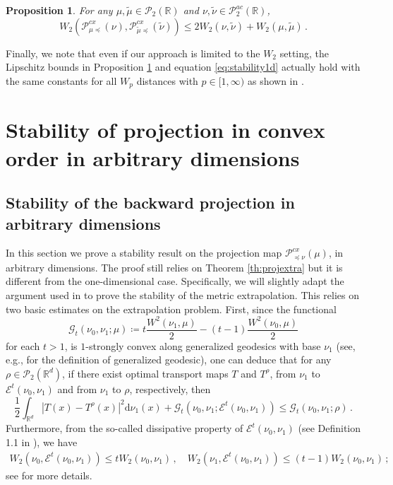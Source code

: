 \documentclass[12pt]{amsart}
\def\ed{\mathrm{d}}
\def\mc#1{\mathcal{#1}}
\newtheorem{proposition}{Proposition}
\begin{document}
\begin{proposition}\label{prop:lipforward1d}
    For any $\mu, \tilde{\mu}\in\mc{P}_2(\mathbb{R})$ and $\nu,\tilde{\nu}\in\mc{P}^{ac}_2(\mathbb{R})$,
\[
    W_2(\mathscr{P}_{\mu \preceq }^{cx}(\nu),\mathscr{P}_{\tilde{\mu} \preceq }^{cx}(\tilde{\nu}))\leq 2 W_2(\nu,\tilde{\nu}) +  W_2( \mu, \tilde{\mu})\,.
\]
\end{proposition}



Finally, we note that even if our approach is limited to the $W_2$ setting, the Lipschitz bounds in Proposition \ref{prop:lipforward1d} and equation \eqref{eq:stability1d} actually hold with the same constants for all $W_p$ distances with $p \in [1,\infty)$ as shown in \cite[Theorem 1.1]{jourdain2023lipschitz}.


\section{Stability of projection in convex order in arbitrary dimensions}

\subsection{Stability of the backward projection in arbitrary dimensions}

In this section we prove a stability result on the projection map $\mathscr{P}^{cx}_{\preceq \nu}(\mu)$,
in arbitrary  dimensions. The proof still relies on Theorem \ref{th:projextra} but it is different from the one-dimensional case.
Specifically, we will slightly adapt the argument used in \cite{Gallouet2025} to prove the stability of the metric extrapolation. This relies on two basic estimates on the extrapolation problem. 
First, since the functional
\[
\mc{G}_t(\nu_0,\nu_1; \mu) \coloneqq t \frac{W^2(\nu_1,\mu)}{2} - (t-1) \frac{W^2(\nu_0,\mu)}{2}
\]
for each $t>1$, is $1$-strongly convex along generalized geodesics with base $\nu_1$ (see, e.g., \cite{ambrosio2005gradient} for the definition of generalized geodesic), one can deduce that  for any $\rho \in \mc{P}_2(\mathbb{R}^d)$, if there exist optimal transport maps $T$ and $T^\rho$, from $\nu_1$ to $\mathscr{E}^t(\nu_0,\nu_1)$ and from $\nu_1$ to $\rho$, respectively, then
\begin{equation}\label{eq:strongc}
\frac{1}{2} \int_{\mathbb{R}^d} |T(x)-T^\rho(x)|^2\ed \nu_1(x) + \mc{G}_t(\nu_0,\nu_1; \mathscr{E}^t(\nu_0,\nu_1)) \leq \mc{G}_t(\nu_0,\nu_1; \rho) \,.
\end{equation}
Furthermore, from the so-called dissipative property of $\mathscr{E}^t(\nu_0,\nu_1)$ (see Definition 1.1 in \cite{gallouet2024geodesic}), we have 
\begin{align}\label{eq:extrapolation-ineq}
W_2(\nu_0, \mathscr{E}^t(\nu_0,\nu_1)) \leq t W_2(\nu_0,\nu_1) \,, \quad W_2(\nu_1, \mathscr{E}^t(\nu_0,\nu_1)) \leq (t-1) W_2(\nu_0,\nu_1)\,;
\end{align}
see \cite{gallouet2024geodesic} for more details.
\end{document}

